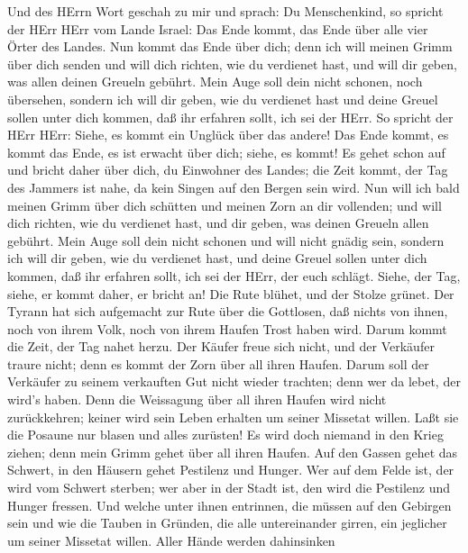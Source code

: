  Und des HErrn Wort geschah zu mir und sprach: 
Du Menschenkind, so spricht der HErr HErr vom Lande Israel: Das Ende
kommt, das Ende über alle vier Örter des Landes.  Nun kommt
das Ende über dich; denn ich will meinen Grimm über dich senden und will
dich richten, wie du verdienet hast, und will dir geben, was allen
deinen Greueln gebührt.  Mein Auge soll dein nicht schonen,
noch übersehen, sondern ich will dir geben, wie du verdienet hast und
deine Greuel sollen unter dich kommen, daß ihr erfahren sollt, ich sei
der HErr.  So spricht der HErr HErr: Siehe, es kommt ein
Unglück über das andere!  Das Ende kommt, es kommt das Ende,
es ist erwacht über dich; siehe, es kommt!  Es gehet schon
auf und bricht daher über dich, du Einwohner des Landes; die Zeit kommt,
der Tag des Jammers ist nahe, da kein Singen auf den Bergen sein wird.
 Nun will ich bald meinen Grimm über dich schütten und
meinen Zorn an dir vollenden; und will dich richten, wie du verdienet
hast, und dir geben, was deinen Greueln allen gebührt.  Mein
Auge soll dein nicht schonen und will nicht gnädig sein, sondern ich
will dir geben, wie du verdienet hast, und deine Greuel sollen unter
dich kommen, daß ihr erfahren sollt, ich sei der HErr, der euch schlägt.
 Siehe, der Tag, siehe, er kommt daher, er bricht an! Die
Rute blühet, und der Stolze grünet.  Der Tyrann hat sich
aufgemacht zur Rute über die Gottlosen, daß nichts von ihnen, noch von
ihrem Volk, noch von ihrem Haufen Trost haben wird.  Darum
kommt die Zeit, der Tag nahet herzu. Der Käufer freue sich nicht, und
der Verkäufer traure nicht; denn es kommt der Zorn über all ihren
Haufen.  Darum soll der Verkäufer zu seinem verkauften Gut
nicht wieder trachten; denn wer da lebet, der wird's haben. Denn die
Weissagung über all ihren Haufen wird nicht zurückkehren; keiner wird
sein Leben erhalten um seiner Missetat willen.  Laßt sie
die Posaune nur blasen und alles zurüsten! Es wird doch niemand in den
Krieg ziehen; denn mein Grimm gehet über all ihren Haufen. 
Auf den Gassen gehet das Schwert, in den Häusern gehet Pestilenz und
Hunger. Wer auf dem Felde ist, der wird vom Schwert sterben; wer aber in
der Stadt ist, den wird die Pestilenz und Hunger fressen. 
Und welche unter ihnen entrinnen, die müssen auf den Gebirgen sein und
wie die Tauben in Gründen, die alle untereinander girren, ein jeglicher
um seiner Missetat willen.  Aller Hände werden dahinsinken
